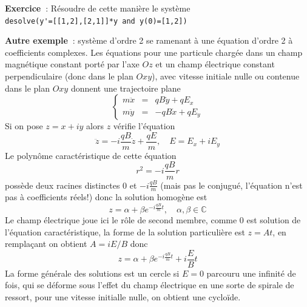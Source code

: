 \documentclass[a4paper,11pt]{book}
\begin{document}
\begin{giacjshere}
{\bf Exercice~}: R\'esoudre de cette mani\`ere le syst\`eme\\
\verb|desolve(y'=[[1,2],[2,1]]*y and y(0)=[1,2])|\\

{\bf Autre exemple~}: syst\`eme d'ordre 2 se ramenant \`a une \'equation
d'ordre 2 \`a coefficients complexes. Les \'equations pour une particule
charg\'ee dans un champ magn\'etique constant port\'e par l'axe $Oz$ et
un champ \'electrique constant perpendiculaire (donc dans le plan $Oxy$),
avec vitesse initiale nulle ou contenue dans le plan $Oxy$ donnent une 
trajectoire plane
$$ \left\{ \begin{array}{ccc} m\ddot{x}&=&qB\dot{y} +qE_x\\
m\ddot{y}&=& -qB\dot{x} +qE_y
\end{array} \right.$$
Si on pose $z=x+iy$ alors $z$ v\'erifie l'\'equation
$$ \ddot{z}=-i\frac{qB}{m} \dot{z}+\frac{qE}{m}, \quad E=E_x+iE_y$$
Le polyn\^ome caract\'eristique de cette \'equation 
$$r^2=-i\frac{qB}{m}r$$
poss\`ede deux racines distinctes 0 et $-i\frac{qB}{m}$ (mais pas le
conjugu\'e, l'\'equation n'est pas \`a coefficients r\'eels!) donc
la solution homog\`ene est 
$$z=\alpha + \beta e^{-i\frac{qB}{m}t}, \quad \alpha,\beta \in \mathbb{C}$$
Le champ \'electrique joue ici le r\^ole de second membre, comme 0
est solution de l'\'equation caract\'eristique, la forme de la 
solution particuli\`ere est $z=At$, en rempla\c{c}ant on obtient 
$ A=iE/B$ donc
$$z=\alpha + \beta e^{-i\frac{qB}{m}t}+i\frac{E}{B}t $$
La forme g\'en\'erale des solutions est un cercle si $E=0$
parcouru une infinit\'e de fois, qui se d\'eforme sous l'effet
du champ \'electrique en une sorte de spirale de ressort, pour
une vitesse initialle nulle, on obtient une cyclo\"ide.


\end{giacjshere}
\end{document}
